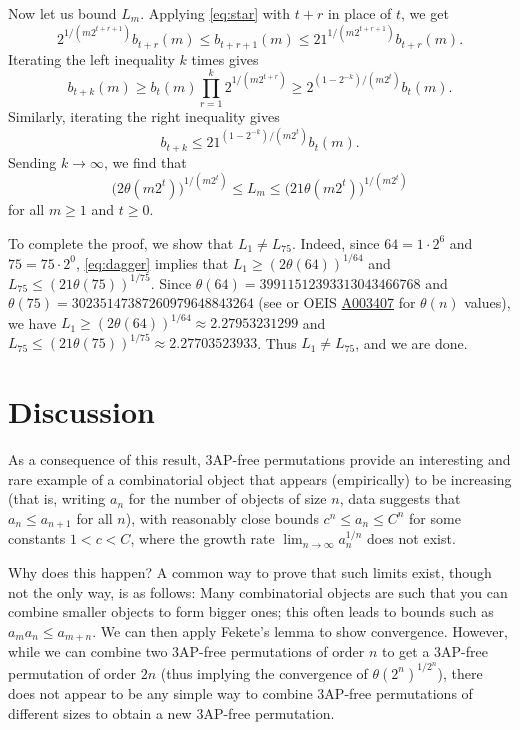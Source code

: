 \documentclass[twoside, reqno]{amsart} %
\begin{document}
Now let us bound $L_m$. Applying \eqref{eq:star} with $t+r$ in place of $t$, we get
\begin{equation}
2^{1/(m2^{t+r+1})}b_{t+r}(m)\le b_{t+r+1}(m)\le21^{1/(m2^{t+r+1})}b_{t+r}(m).
\end{equation}
Iterating the left inequality $k$ times gives
\begin{equation}
b_{t+k}(m)\ge b_t(m)\prod_{r=1}^k2^{1/(m2^{t+r})}
\ge 2^{(1-2^{-k})/(m2^t)}b_t(m).
\end{equation}
Similarly, iterating the right inequality gives
\begin{equation*}
b_{t+k}\le 21^{(1-2^{-k})/(m2^t)}b_t(m).
\end{equation*}
Sending $k\to\infty$, we find that
\begin{equation} \label{eq:dagger} 
\bigl(2\theta(m2^t)\bigr)^{1/(m2^t)}
\le L_m
\le \bigl(21\theta(m2^t)\bigr)^{1/(m2^t)}
\end{equation}
for all $m\ge1$ and $t\ge0$.

To complete the proof, we show that $L_1\ne L_{75}$.
Indeed, since $64=1\cdot2^6$ and $75=75\cdot2^0$, \eqref{eq:dagger} implies that
$L_1\ge(2\theta(64))^{1/64}$ and $L_{75}\le(21\theta(75))^{1/75}$.
Since $\theta(64)=39911512393313043466768$ and $\theta(75)=30235147387260979648843264$
(see \cite{CH17} or OEIS \href{https://oeis.org/A003407}{A003407} for $\theta(n)$ values),
we have $L_1\ge(2\theta(64))^{1/64}\approx2.27953231299$
and $L_{75}\le(21\theta(75))^{1/75}\approx2.27703523933$.
Thus $L_1\ne L_{75}$, and we are done. 

\section{Discussion}
As a consequence of this result, $3$AP-free permutations provide an 
interesting and rare example of a combinatorial object that appears
(empirically) to be increasing (that is, writing $a_n$ for the number of objects of
size $n$, data suggests that $a_n\le a_{n+1}$ for all $n$), 
with reasonably close bounds $c^n\le a_n\le C^n$ for some constants $1<c<C$,
where the growth rate $\lim_{n\to\infty}a_n^{1/n}$ does not exist.

Why does this happen?
A common way to prove that such limits exist, though not the only way, is as follows:
Many combinatorial objects are such that you can combine smaller objects
to form bigger ones; this often leads to bounds such as $a_ma_n\le a_{m+n}$.
We can then apply Fekete's lemma to show convergence. However, while we can
combine two $3$AP-free permutations of order $n$ to get a $3$AP-free permutation
of order $2n$ (thus implying the convergence of $\theta(2^n)^{1/2^n}$),
there does not appear to be any simple way to combine $3$AP-free 
permutations of different sizes to obtain a new $3$AP-free permutation.
\end{document}
